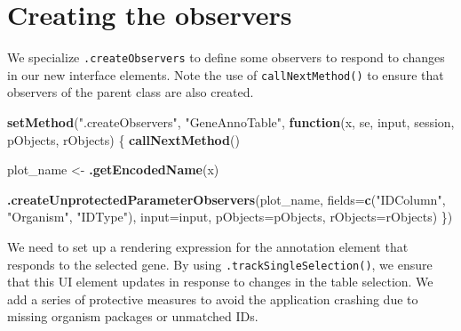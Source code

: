 \documentclass[]{book}
\newenvironment{Shaded}{\begin{snugshade}}{\end{snugshade}}
\newcommand{\KeywordTok}[1]{\textcolor[rgb]{0.13,0.29,0.53}{\textbf{#1}}}
\newcommand{\DataTypeTok}[1]{\textcolor[rgb]{0.13,0.29,0.53}{#1}}
\newcommand{\StringTok}[1]{\textcolor[rgb]{0.31,0.60,0.02}{#1}}
\newcommand{\ControlFlowTok}[1]{\textcolor[rgb]{0.13,0.29,0.53}{\textbf{#1}}}
\newcommand{\NormalTok}[1]{#1}
\begin{document}
\section{Creating the observers}\label{creating-the-observers-2}

We specialize \texttt{.createObservers} to define some observers to
respond to changes in our new interface elements. Note the use of
\texttt{callNextMethod()} to ensure that observers of the parent class
are also created.

\begin{Shaded}
\begin{Highlighting}[]
\KeywordTok{setMethod}\NormalTok{(}\StringTok{".createObservers"}\NormalTok{, }\StringTok{"GeneAnnoTable"}\NormalTok{,}
    \ControlFlowTok{function}\NormalTok{(x, se, input, session, pObjects, rObjects)}
\NormalTok{\{}
    \KeywordTok{callNextMethod}\NormalTok{()}

\NormalTok{    plot_name <-}\StringTok{ }\KeywordTok{.getEncodedName}\NormalTok{(x)}

    \KeywordTok{.createUnprotectedParameterObservers}\NormalTok{(plot_name,}
        \DataTypeTok{fields=}\KeywordTok{c}\NormalTok{(}\StringTok{"IDColumn"}\NormalTok{, }\StringTok{"Organism"}\NormalTok{, }\StringTok{"IDType"}\NormalTok{), }
        \DataTypeTok{input=}\NormalTok{input, }\DataTypeTok{pObjects=}\NormalTok{pObjects, }\DataTypeTok{rObjects=}\NormalTok{rObjects)}
\NormalTok{\})}
\end{Highlighting}
\end{Shaded}

We need to set up a rendering expression for the annotation element that
responds to the selected gene. By using
\texttt{.trackSingleSelection()}, we ensure that this UI element updates
in response to changes in the table selection. We add a series of
protective measures to avoid the application crashing due to missing
organism packages or unmatched IDs.
\end{document}
